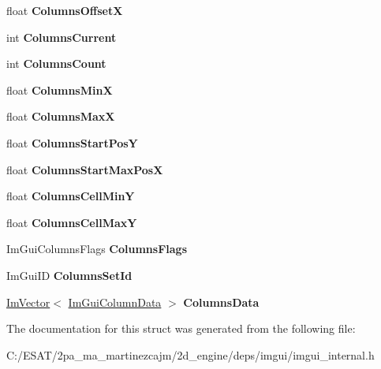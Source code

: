 \begin{DoxyCompactItemize}
float {\bfseries Columns\+OffsetX}
\item 
\mbox{\label{struct_im_gui_draw_context_aeeac02b1b1dd8e02e017befff8cf9e34}} 
int {\bfseries Columns\+Current}
\item 
\mbox{\label{struct_im_gui_draw_context_ab068622174203ba86e835980cad066b6}} 
int {\bfseries Columns\+Count}
\item 
\mbox{\label{struct_im_gui_draw_context_ad86d60b4523f423749d944ba56902c83}} 
float {\bfseries Columns\+MinX}
\item 
\mbox{\label{struct_im_gui_draw_context_aa6b05d0a845896193dff628b02f71ba0}} 
float {\bfseries Columns\+MaxX}
\item 
\mbox{\label{struct_im_gui_draw_context_adc5c108aa693534f656018ca095dd2ee}} 
float {\bfseries Columns\+Start\+PosY}
\item 
\mbox{\label{struct_im_gui_draw_context_af1fd970d3806165e93870172231bb1b8}} 
float {\bfseries Columns\+Start\+Max\+PosX}
\item 
\mbox{\label{struct_im_gui_draw_context_a675eb10cf0c56322f8e9a6c40e33a7ea}} 
float {\bfseries Columns\+Cell\+MinY}
\item 
\mbox{\label{struct_im_gui_draw_context_a91c90b98539dc2b1522dd3f7bafa3b21}} 
float {\bfseries Columns\+Cell\+MaxY}
\item 
\mbox{\label{struct_im_gui_draw_context_acd823cd056a5922a9f3a7c8844451ea7}} 
Im\+Gui\+Columns\+Flags {\bfseries Columns\+Flags}
\item 
\mbox{\label{struct_im_gui_draw_context_a7bb2cdab76e2b7cc12af2c87eeaafc0a}} 
Im\+Gui\+ID {\bfseries Columns\+Set\+Id}
\item 
\mbox{\label{struct_im_gui_draw_context_ae0f7e8f70065e8ddc45d62cf33195a0f}} 
\hyperlink{class_im_vector}{Im\+Vector}$<$ \hyperlink{struct_im_gui_column_data}{Im\+Gui\+Column\+Data} $>$ {\bfseries Columns\+Data}
\end{DoxyCompactItemize}


The documentation for this struct was generated from the following file\+:\begin{DoxyCompactItemize}
\item 
C\+:/\+E\+S\+A\+T/2pa\+\_\+ma\+\_\+martinezcajm/2d\+\_\+engine/deps/imgui/imgui\+\_\+internal.\+h\end{DoxyCompactItemize}
